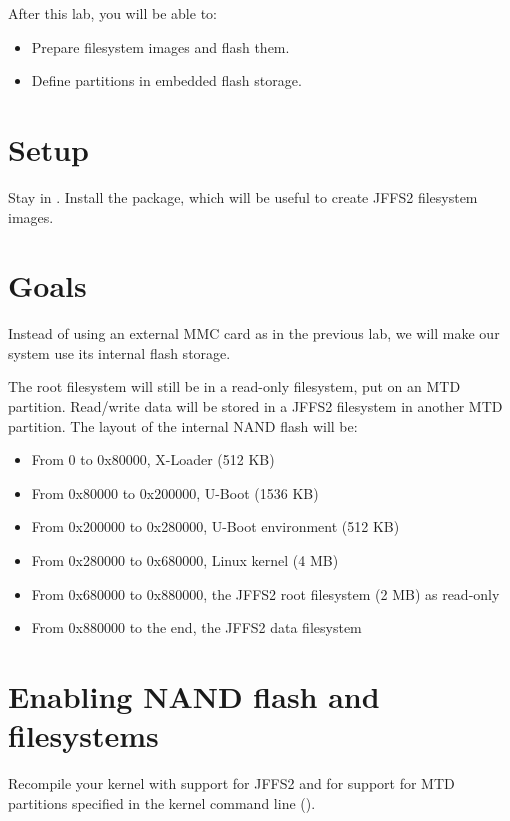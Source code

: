 
After this lab, you will be able to:
\begin{itemize}
\item Prepare filesystem images and flash them.
\item Define partitions in embedded flash storage.
\end{itemize}

\section{Setup}

Stay in . Install the
 package, which will be useful to create JFFS2
filesystem images.

\section{Goals}

Instead of using an external MMC card as in the previous lab, we will
make our system use its internal flash storage.

The root filesystem will still be in a read-only filesystem, put on an
MTD partition.  Read/write data will be stored in a JFFS2 filesystem
in another MTD partition. The layout of the internal NAND flash will
be:

\begin{itemize}
\item From 0 to 0x80000, X-Loader (512 KB)
\item From 0x80000 to 0x200000, U-Boot (1536 KB)
\item From 0x200000 to 0x280000, U-Boot environment (512 KB)
\item From 0x280000 to 0x680000, Linux kernel (4 MB)
\item From 0x680000 to 0x880000, the JFFS2 root filesystem (2 MB) as read-only
\item From 0x880000 to the end, the JFFS2 data filesystem
\end{itemize}

\section{Enabling NAND flash and filesystems}

Recompile your kernel with support for JFFS2 and for support for MTD
partitions specified in the kernel command line
().

